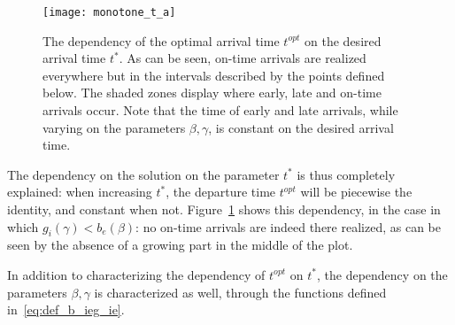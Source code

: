 \begin{figure}
  \centering
  \texttt{[image: monotone\_t\_a]}
  \caption{The dependency of the optimal arrival time \(t^{opt}\) on the desired arrival time \(t^*\).
    As can be seen, on-time arrivals are realized everywhere but in the intervals described by the points defined below.
    The shaded zones display where early, late and on-time arrivals occur.
    Note that the time of early and late arrivals, while varying on the parameters \(\beta, \gamma\),
  is constant on the desired arrival time.}
  \label{fig:t_opt_on_star}
\end{figure}

The dependency on the solution on the parameter \(t^*\) is thus completely explained:
when increasing \(t^*\), the departure time \(t^{opt}\) will be piecewise the identity,
and constant when not.
Figure~\ref{fig:t_opt_on_star} shows this dependency, in the case in which \(g_i(\gamma) < b_e(\beta)\):
no on-time arrivals are indeed there realized, as can be seen by the absence of a growing part in the middle of the plot.

In addition to characterizing the dependency of \(t^{opt}\) on \(t^*\),
the dependency on the parameters \(\beta, \gamma\) is characterized as well, through the functions defined in~\eqref{eq:def_b_ieg_ie}.

